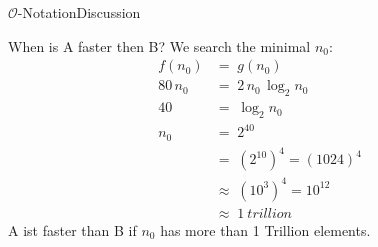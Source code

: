 
\begin{frame}{$\mathcal{O}$-Notation}{Discussion}
  \begin{block}{When is A faster then B?}%
    We search the minimal $n_0$:
    \begin{align*}%
      f(n_0) & = \; g(n_0)\\
      80 \, n_0 & = \; 2 \, n_0 \, \log_2 n_0\\
      40 & = \; \log_2 n_0\\
      n_0 & = \; 2^{40}\\
      {} & = \; (2^{10})^4 = (1024)^4\\
      {} & \approx \; (10^3)^4 = 10^{12}\\
      {} & \approx \; \SI{1}{trillion}
    \end{align*}
    A ist faster than B if $n_0$ has more than 1 Trillion elements.
  \end{block}
\end{frame}
